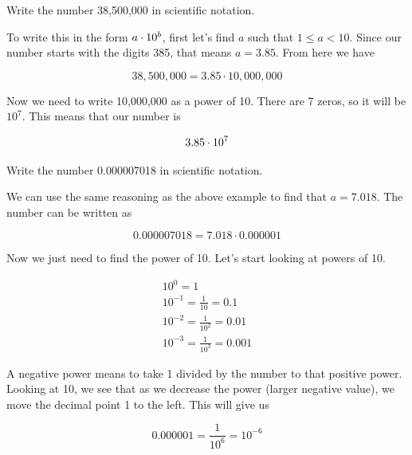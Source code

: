 \documentclass[12pt]{book}
\begin{document}
\linespace

\example

Write the number 38,500,000 in scientific notation.

\hspace{10pt}

To write this in the form $a \cdot 10^{b}$, first let's find $a$ such that $1 \leq a < 10$. Since our number starts with the digits 385, that means $a = 3.85$. From here we have

\begin{equation}
38,500,000 = 3.85 \cdot 10,000,000
\end{equation}

Now we need to write 10,000,000 as a power of 10. There are 7 zeros, so it will be $10^7$. This means that our number is 

\begin{equation}
3.85 \cdot 10^{7}
\end{equation}

\linespace

\example

Write the number 0.000007018 in scientific notation.

\hspace{10pt}

We can use the same reasoning as the above example to find that $a = 7.018$. The number can be written as

\begin{equation}
0.000007018 = 7.018 \cdot 0.000001
\end{equation}

Now we just need to find the power of 10. Let's start looking at powers of 10.

\begin{equation}
\begin{split}
10^0 = 1 \\
10^{-1} = \frac{1}{10} = 0.1 \\
10^{-2} = \frac{1}{10^2} = 0.01 \\
10^{-3} = \frac{1}{10^3} = 0.001
\end{split}
\end{equation}

A negative power means to take 1 divided by the number to that positive power. Looking at 10, we see that as we decrease the power (larger negative value), we move the decimal point 1 to the left. This will give us

\begin{equation}
0.000001 = \frac{1}{10^6} = 10^{-6}
\end{equation}
\end{document}
